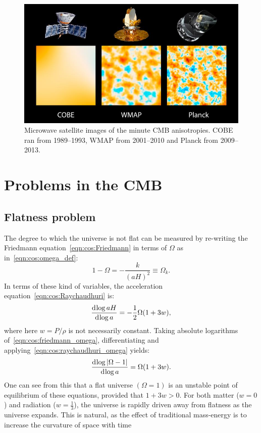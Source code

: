 \begin{figure}[tp]
  \centering
  \includegraphics[width=\textwidth]{chapters/inflationary_cosmology/figures/satellites}
  \caption{Microwave satellite images of the minute CMB anisotropies. COBE ran from 1989--1993, WMAP from 2001--2010 and Planck from 2009--2013.}\label{fig:cos:satellites}
\end{figure}

\section{Problems in the CMB}
\subsection{Flatness problem}
The degree to which the universe is not flat can be measured by re-writing the Friedmann equation~\eqref{eqn:cos:Friedmann} in terms of $\Omega$ as in~\eqref{eqn:cos:omega_def}:
\begin{equation}
  1-\Omega = -\frac{k}{{(aH)}^2} \equiv \Omega_k.
  \label{eqn:cos:friedmann_omega}
\end{equation}
In terms of these kind of variables, the acceleration equation~\eqref{eqn:cos:Raychaudhuri} is:
\begin{equation}
  \frac{\operatorname{d}^{}\!{\log aH}}{\operatorname{d}^{}\!{\log a} } = -\frac{1}{2}\Omega(1+3w),
  \label{eqn:cos:raychaudhuri_omega}
\end{equation}
where here $w=P/\rho$ is not necessarily constant.
Taking absolute logarithms of~\eqref{eqn:cos:friedmann_omega}, differentiating and applying~\eqref{eqn:cos:raychaudhuri_omega} yields:
\begin{equation}
  \frac{\operatorname{d}^{}\!{\log |\Omega-1|}}{\operatorname{d}^{}\!{\log a} } = \Omega(1+3w).
  \label{eqn:cos:instability}
\end{equation}
One can see from this that a flat universe $(\Omega=1)$ is an unstable point of equilibrium of these equations, provided that $1+3w>0$. For both matter (${w=0}$) and radiation (${w=\frac{1}{3}}$), the universe is rapidly driven away from flatness as the universe expands. This is natural, as the effect of traditional mass-energy is to increase the curvature of space with time

